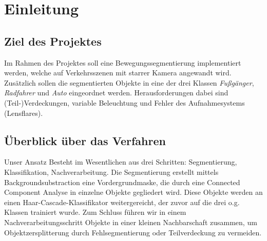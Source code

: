 \documentclass[conference]{IEEEtran}
\begin{document}





%
\IEEEpeerreviewmaketitle



\section{Einleitung}

 

\subsection{Ziel des Projektes}
Im Rahmen des Projektes soll eine Bewegungssegmentierung implementiert werden, welche auf Verkehrsszenen mit starrer Kamera angewandt wird. Zusätzlich sollen die segmentierten Objekte in eine der drei Klassen \textit{Fußgänger}, \textit{Radfahrer} und \textit{Auto} eingeordnet werden. Herausforderungen dabei sind (Teil-)Verdeckungen, variable Beleuchtung und Fehler des Aufnahmesystems (Lensflares).

\subsection{Überblick über das Verfahren}
Unser Ansatz Besteht im Wesentlichen aus drei Schritten: Segmentierung, Klassifikation, Nachverarbeitung. Die Segmentierung erstellt mittels Backgroundsubstraction eine Vordergrundmaske, die durch eine Connected Component Analyse in einzelne Objekte gegliedert wird. Diese Objekte werden an einen Haar-Cascade-Klassifikator weitergereicht, der zuvor auf die drei o.g. Klassen trainiert wurde. Zum Schluss führen wir in einem Nachverarbeitungsschritt Objekte in einer kleinen Nachbarschaft zusammen, um Objektzersplitterung durch Fehlsegmentierung oder Teilverdeckung zu vermeiden.
\end{document}
